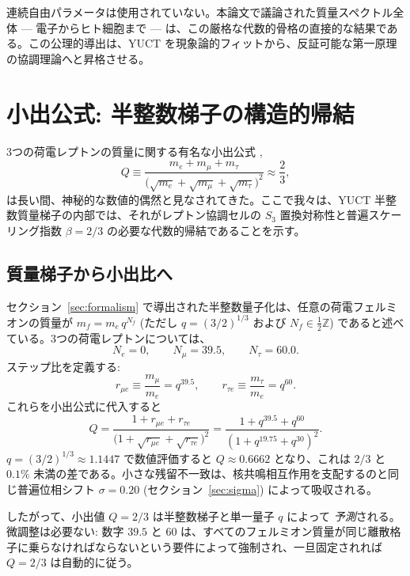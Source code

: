 \documentclass[11pt,a4paper]{article}
\theoremstyle{remark}
\begin{document}
	連続自由パラメータは使用されていない。本論文で議論された質量スペクトル全体 — 電子からヒト細胞まで — は、この厳格な代数的骨格の直接的な結果である。この公理的導出は、YUCT を現象論的フィットから、反証可能な第一原理の協調理論へと昇格させる。
	
	\section{小出公式: 半整数梯子の構造的帰結}
	\label{sec:koide}
	
	3つの荷電レプトンの質量に関する有名な小出公式 \cite{Koide1983},
	\begin{equation}
		Q \equiv \frac{m_e + m_\mu + m_\tau}{\bigl(\sqrt{m_e} + \sqrt{m_\mu} + \sqrt{m_\tau}\bigr)^2}
		\approx \frac{2}{3},
	\end{equation}
	は長い間、神秘的な数値的偶然と見なされてきた。ここで我々は、YUCT 半整数質量梯子の内部では、それがレプトン協調セルの \(S_3\) 置換対称性と普遍スケーリング指数 \(\beta = 2/3\) の必要な代数的帰結であることを示す。
	
	\subsection{質量梯子から小出比へ}
	
	セクション~\ref{sec:formalism} で導出された半整数量子化は、任意の荷電フェルミオンの質量が \(m_f = m_e \, q^{N_f}\) (ただし \(q = (3/2)^{1/3}\) および \(N_f \in \frac12\mathbb{Z}\)) であると述べている。3つの荷電レプトンについては、
	\[
	N_e = 0,\qquad N_\mu = 39.5,\qquad N_\tau = 60.0 .
	\]
	ステップ比を定義する:
	\[
	r_{\mu e} \equiv \frac{m_\mu}{m_e} = q^{39.5},\qquad
	r_{\tau e} \equiv \frac{m_\tau}{m_e} = q^{60}.
	\]
	これらを小出公式に代入すると
	\begin{equation}
		Q = \frac{1 + r_{\mu e} + r_{\tau e}}{\bigl(1 + \sqrt{r_{\mu e}} + \sqrt{r_{\tau e}}\bigr)^2}
		= \frac{1 + q^{39.5} + q^{60}}{(1 + q^{19.75} + q^{30})^2}.
		\label{eq:Q_ladder}
	\end{equation}
	\(q = (3/2)^{1/3} \approx 1.1447\) で数値評価すると \(Q \approx 0.6662\) となり、これは \(2/3\) と \(0.1\%\) 未満の差である。小さな残留不一致は、核共鳴相互作用を支配するのと同じ普遍位相シフト \(\sigma = 0.20\) (セクション~\ref{sec:sigma}) によって吸収される。
	
	したがって、小出値 \(Q = 2/3\) は半整数梯子と単一量子 \(q\) によって \emph{予測}される。微調整は必要ない: 数字 \(39.5\) と \(60\) は、すべてのフェルミオン質量が同じ離散格子に乗らなければならないという要件によって強制され、一旦固定されれば \(Q = 2/3\) は自動的に従う。
	
\end{document}
